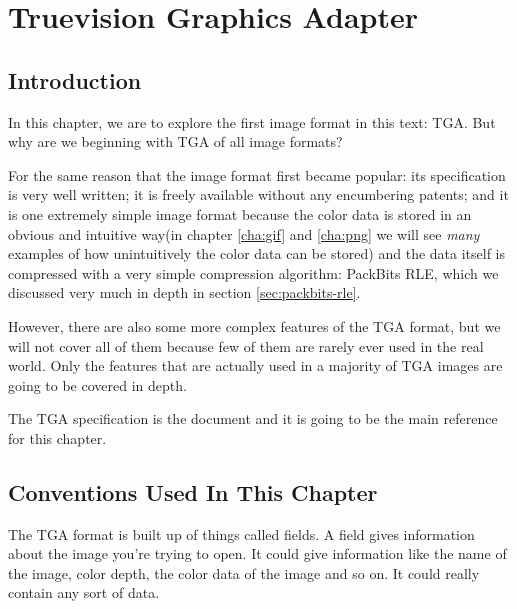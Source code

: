 \begin{comment}
  
\end{comment}


\chapter{Truevision Graphics Adapter}
\label{cha:tga}

\section{Introduction}
\label{sec:tga-introduction}

In this chapter, we are to explore the first image format in this
text: TGA. But why are we beginning with TGA of all image
formats?

For the same reason that the image format first became popular: its
specification is very well written; it is freely available without any
encumbering patents; and it is one extremely simple image format
because the color data is stored in an obvious and intuitive way(in
chapter \ref{cha:gif} and \ref{cha:png} we will see \textit{many}
examples of how unintuitively the color data can be stored) and the
data itself is compressed with a very simple compression algorithm:
PackBits RLE, which we discussed very much in depth in section
\ref{sec:packbits-rle}. \cite{murray1996encyclopedia}

However, there are also some more complex features of the TGA format,
but we will not cover all of them because few of them are rarely ever
used in the real world. Only the features that are actually used in a
majority of TGA images are going to be covered in depth.

The TGA specification is the document
\cite{91:_truev_tga_file_format_specif} and it is going to be the main
reference for this chapter.

\section{Conventions Used In This Chapter}

The TGA format is built up of things called fields. A
field gives information about the image you're trying to open. It
could give information like the name of the image, color depth, the
color data of the image and so on. It could really contain any sort of
data.

